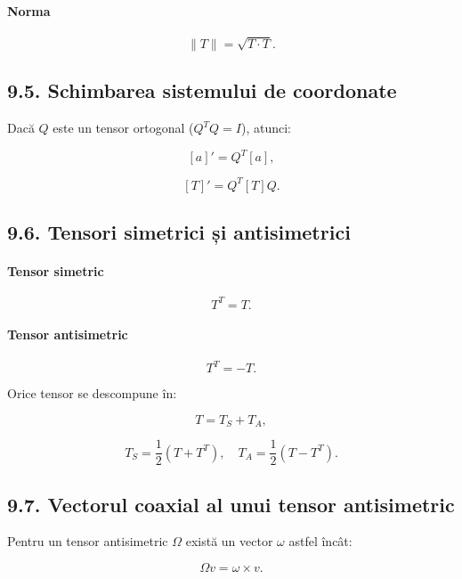 \documentclass[12pt,a4paper]{article}
\begin{document}
\paragraph{Norma}


\[
\|T\| = \sqrt{T \cdot T}.
\]



\subsection{9.5. Schimbarea sistemului de coordonate}

Dacă $Q$ este un tensor ortogonal ($Q^T Q = I$), atunci:



\[
[a]' = Q^T [a],
\]




\[
[T]' = Q^T [T] Q.
\]



\subsection{9.6. Tensori simetrici și antisimetrici}

\paragraph{Tensor simetric}


\[
T^T = T.
\]



\paragraph{Tensor antisimetric}


\[
T^T = -T.
\]



Orice tensor se descompune în:


\[
T = T_S + T_A,
\]




\[
T_S = \frac{1}{2}(T + T^T), \quad
T_A = \frac{1}{2}(T - T^T).
\]



\subsection{9.7. Vectorul coaxial al unui tensor antisimetric}

Pentru un tensor antisimetric $\Omega$ există un vector $\omega$ astfel încât:


\[
\Omega v = \omega \times v.
\]
\end{document}
